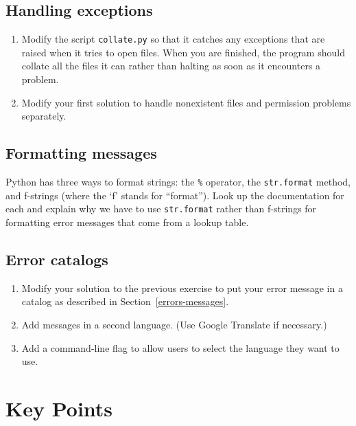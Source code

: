 \documentclass[
]{krantz}
\providecommand{\tightlist}{%
  \setlength{\itemsep}{0pt}\setlength{\parskip}{0pt}}
\begin{document}
\hypertarget{errors-ex-exceptions}{%
\subsection{Handling exceptions}\label{errors-ex-exceptions}}

\begin{enumerate}
\def\labelenumi{\arabic{enumi}.}
\tightlist
\item
  Modify the script \texttt{collate.py} so that it catches any exceptions
  that are raised when it tries to open files.
  When you are finished,
  the program should collate all the files it can
  rather than halting as soon as it encounters a problem.
\item
  Modify your first solution to handle nonexistent files
  and permission problems separately.
\end{enumerate}

\hypertarget{errors-ex-format}{%
\subsection{Formatting messages}\label{errors-ex-format}}

Python has three ways to format strings: the \texttt{\%} operator,
the \texttt{str.format} method,
and f-strings (where the `f' stands for ``format'').
Look up the documentation for each
and explain why we have to use \texttt{str.format} rather than f-strings
for formatting error messages that come from a lookup table.

\hypertarget{errors-ex-catalog}{%
\subsection{Error catalogs}\label{errors-ex-catalog}}

\begin{enumerate}
\def\labelenumi{\arabic{enumi}.}
\tightlist
\item
  Modify your solution to the previous exercise
  to put your error message in a catalog
  as described in Section~\ref{errors-messages}.
\item
  Add messages in a second language.
  (Use Google Translate if necessary.)
\item
  Add a command-line flag to allow users to select the language they want to use.
\end{enumerate}

\hypertarget{errors-keypoints}{%
\section{Key Points}\label{errors-keypoints}}
\end{document}

